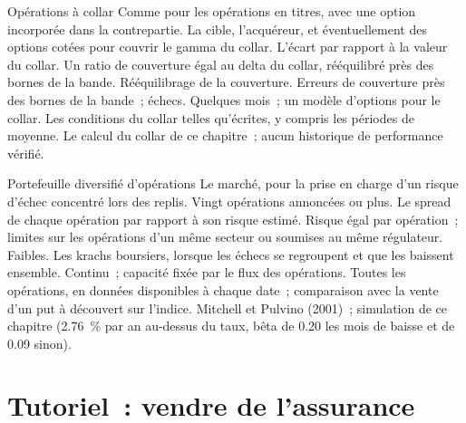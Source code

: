 \begin{strategyfile}{Opérations à collar}\label{strat:s1:merger-arbitrage:collar}
 Comme pour les opérations en titres, avec une option incorporée dans la contrepartie.
 La cible, l'acquéreur, et éventuellement des options cotées pour couvrir le gamma du collar.
 L'écart par rapport à la valeur du collar.
 Un ratio de couverture égal au delta du collar, rééquilibré près des bornes de la bande.
 Rééquilibrage de la couverture.
 Erreurs de couverture près des bornes de la bande~; échecs.
 Quelques mois~; un modèle d'options pour le collar.
 Les conditions du collar telles qu'écrites, y compris les périodes de moyenne.
 Le calcul du collar de ce chapitre~; aucun historique de performance vérifié.
\end{strategyfile}

\begin{strategyfile}{Portefeuille diversifié d'opérations}\label{strat:s1:merger-arbitrage:portfolio}
 Le marché, pour la prise en charge d'un risque d'échec concentré lors des replis.
 Vingt opérations annoncées ou plus.
 Le spread de chaque opération par rapport à son risque estimé.
 Risque égal par opération~; limites sur les opérations d'un même secteur ou soumises au même régulateur.
 Faibles.
 Les krachs boursiers, lorsque les échecs se regroupent et que les  baissent ensemble.
 Continu~; capacité fixée par le flux des opérations.
 Toutes les opérations, en données disponibles à chaque date~; comparaison avec la vente d'un put à découvert sur l'indice.
 Mitchell et Pulvino (2001)~; simulation de ce chapitre (2.76~\% par an au-dessus du taux, bêta de 0.20 les mois de baisse et de 0.09 sinon).
\end{strategyfile}

\section{Tutoriel~: vendre de l'assurance}\label{tut:s1:merger-arbitrage:tut}

